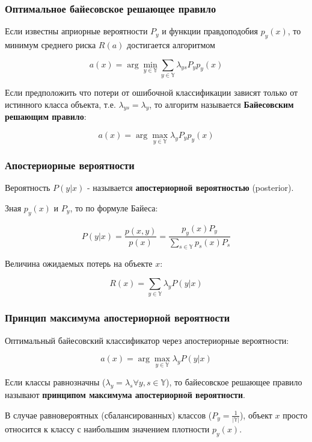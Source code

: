 \documentclass{beamer}
\begin{document}
	\begin{frame}
		\frametitle{Оптимальное байесовское решающее правило}
		Если известны априорные вероятности $P_y$ и функции правдоподобия $p_y(x)$, то минимум среднего риска $R(a)$ достигается алгоритмом
		
		\[
		a(x) = \arg \min_{y \in \mathbb{Y}} \sum_{y \in \mathbb{Y}} \lambda_{ys} P_y p_y(x)
		\]
		
		\vspace{15pt}
		
		Если предположить что потери от ошибочной классификации зависят только от истинного класса объекта, т.е. $\lambda_{ys} = \lambda_{y}$, то алгоритм называется \textbf{Байесовским решающим правило}:
		
		\[
		a(x) = \arg \max_{y \in \mathbb{Y}} \lambda_{y} P_y p_y(x)
		\]
	\end{frame}
	
	\begin{frame}
		\frametitle{Апостериорные вероятности}
		Вероятность $P(y | x)$ - называется \textbf{апостериорной вероятностью} (posterior).
		
		\vspace{10pt}
		
		Зная $p_y(x)$ и $P_y$, то по формуле Байеса:
		
		\[
		P(y | x) = 
		\frac{p(x, y)}{p(x)} =
		\frac{p_y(x) P_y}{\sum_{s \in \mathbb{Y}} p_s(x) P_s}
		\]
		
		\vspace{15pt}
		
		Величина ожидаемых потерь на объекте $x$:
		
		\[
		R(x) =
		\sum_{y \in \mathbb{Y}} \lambda_{y} P(y | x)
		\]
	\end{frame}
	
	\begin{frame}
		\frametitle{Принцип максимума апостериорной вероятности}
		Оптимальный байесовский классификатор через апостериорные вероятности:
		
		\[
		a(x) = \arg \max_{y \in \mathbb{Y}} \lambda_{y} P(y | x)
		\]
		
		\vspace{15pt}
		
		Если классы равнозначны ($\lambda_{y} = \lambda_{s} \forall y, s \in \mathbb{Y}$), то байесовское решающее правило называют \textbf{принципом максимума апостериорной вероятности}.
		
		\vspace{15pt}
		
		В случае равновероятных (сбалансированных) классов ($P_y = \frac{1}{|\mathbb{Y}|}$), объект $x$ просто относится к классу с наибольшим значением плотности $p_y(x)$.
		
	\end{frame}
	
\end{document}
